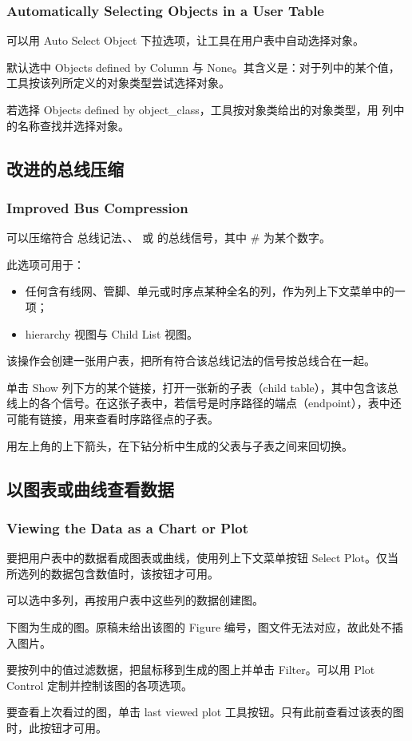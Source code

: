 \subsubsection*{Automatically Selecting Objects in a User Table}

可以用 Auto Select Object 下拉选项，让工具在用户表中自动选择对象。

默认选中 Objects defined by Column 与 None。其含义是：对于列中的某个值，工具按该列所定义的对象类型尝试选择对象。

若选择 Objects defined by object\_class，工具按对象类给出的对象类型，用  列中的名称查找并选择对象。

\subsection{改进的总线压缩}
\subsubsection*{Improved Bus Compression}

可以压缩符合 \cmd{[*]} 总线记法、\cmd{[\#]}、\cmd{\_\#\_/} 或 \cmd{\_\#/} 的总线信号，其中 \# 为某个数字。

此选项可用于：
\begin{itemize}
  \item 任何含有线网、管脚、单元或时序点某种全名的列，作为列上下文菜单中的一项；
  \item hierarchy 视图与 Child List 视图。
\end{itemize}

该操作会创建一张用户表，把所有符合该总线记法的信号按总线合在一起。

单击 Show 列下方的某个链接，打开一张新的子表（child table），其中包含该总线上的各个信号。在这张子表中，若信号是时序路径的端点（endpoint），表中还可能有链接，用来查看时序路径点的子表。

用左上角的上下箭头，在下钻分析中生成的父表与子表之间来回切换。

\subsection{以图表或曲线查看数据}
\subsubsection*{Viewing the Data as a Chart or Plot}

要把用户表中的数据看成图表或曲线，使用列上下文菜单按钮 Select Plot。仅当所选列的数据包含数值时，该按钮才可用。

可以选中多列，再按用户表中这些列的数据创建图。

下图为生成的图。原稿未给出该图的 Figure 编号，图文件无法对应，故此处不插入图片。

要按列中的值过滤数据，把鼠标移到生成的图上并单击 Filter。可以用 Plot Control 定制并控制该图的各项选项。

要查看上次看过的图，单击 last viewed plot 工具按钮。只有此前查看过该表的图时，此按钮才可用。
